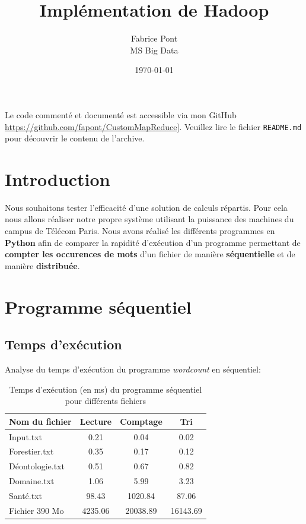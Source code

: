 \documentclass{article}
\title{Implémentation de Hadoop}
\author{Fabrice Pont \\ MS Big Data}
\date{\today}
\begin{document}
\maketitle

Le code commenté et documenté est accessible via mon GitHub \url{https://github.com/fapont/CustomMapReduce}]. Veuillez lire le fichier \texttt{README.md} pour découvrir le contenu de l'archive.

\section{Introduction}
Nous souhaitons tester l'efficacité d'une solution de calculs répartis. Pour cela nous allons réaliser notre propre système utilisant la puissance des machines du campus de
Télécom Paris. Nous avons réalisé les différents programmes en \textbf{Python} afin de comparer la rapidité d'exécution d'un programme permettant de \textbf{compter les occurences de mots} d'un fichier
de manière \textbf{séquentielle} et de manière \textbf{distribuée}.

\section{Programme séquentiel}
\subsection{Temps d'exécution}
Analyse du temps d'exécution du programme \textit{wordcount} en séquentiel:
\begin{table}[h!]
    \begin{center}
        \begin{tabular}{| l || c | c | c |}
            \hline			
              \textbf{Nom du fichier} & \textbf{Lecture} & \textbf{Comptage} & \textbf{Tri} \\ \hline \hline
              Input.txt & 0.21 & 0.04 & 0.02\\ \hline 
              Forestier.txt & 0.35 & 0.17 & 0.12\\ \hline
              Déontologie.txt & 0.51 & 0.67 & 0.82\\ \hline
              Domaine.txt & 1.06 & 5.99 & 3.23\\ \hline
              Santé.txt & 98.43 & 1020.84 & 87.06\\ \hline
              Fichier 390 Mo & 4235.06 & 20038.89 & 16143.69\\
            \hline  
        \end{tabular}
    \end{center}
    \caption{Temps d'exécution (en ms) du programme séquentiel pour différents fichiers }
\end{table}
\end{document}
